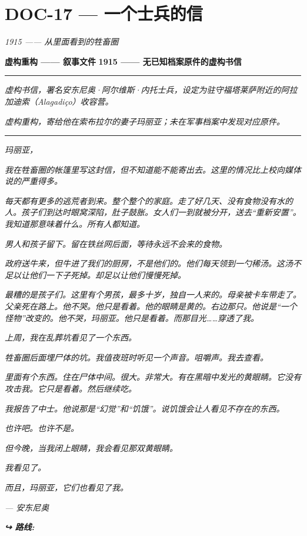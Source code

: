 \section*{\textbf{DOC-17} --- 一个士兵的信}

\noindent \textit{1915 —— 从里面看到的牲畜圈}

\noindent \textbf{虚构重构 —— 叙事文件}
\textbf{1915 —— 无已知档案原件的虚构书信}

\vspace{0.5em}\noindent\rule{\textwidth}{0.5pt}\vspace{0.5em}

\noindent \textit{虚构书信，署名安东尼奥·阿尔维斯·内托士兵，设定为驻守福塔莱萨附近的阿拉加迪索（Alagadiço）收容营。}

\noindent \textit{虚构重构，寄给他在索布拉尔的妻子玛丽亚；未在军事档案中发现对应原件。}

\vspace{0.5em}\noindent\rule{\textwidth}{0.5pt}\vspace{0.5em}

\noindent \textit{玛丽亚，}

\noindent \textit{我在牲畜圈的帐篷里写这封信，但不知道能不能寄出去。这里的情况比上校向媒体说的严重得多。}

\noindent \textit{每天都有更多的逃荒者到来。整个整个的家庭。走了好几天、没有食物没有水的人。孩子们到达时眼窝深陷，肚子鼓胀。女人们一到就被分开，送去“重新安置”。我知道那意味着什么。所有人都知道。}

\noindent \textit{男人和孩子留下。留在铁丝网后面，等待永远不会来的食物。}

\noindent \textit{政府送牛来，但牛进了我们的厨房，不是他们的。他们每天领到一勺稀汤。这汤不足以让他们一下子死掉。却足以让他们慢慢死掉。}

\noindent \textit{最糟的是孩子们。这里有个男孩，最多十岁，独自一人来的。母亲被卡车带走了。父亲死在路上。他不哭。他只是看着。他的眼睛是黄的。右边那只。他说是“一个怪物”改变的。他不哭，玛丽亚。他只是看着。而那目光……穿透了我。}

\noindent \textit{上周，我在乱葬坑看见了一个东西。}

\noindent \textit{牲畜圈后面埋尸体的坑。我值夜班时听见一个声音。咀嚼声。我去查看。}

\noindent \textit{里面有个东西。住在尸体中间。很大。非常大。有在黑暗中发光的黄眼睛。它没有攻击我。它只是看着。然后继续吃。}

\noindent \textit{我报告了中士。他说那是“幻觉”和“饥饿”。说饥饿会让人看见不存在的东西。}

\noindent \textit{也许吧。也许不是。}

\noindent \textit{但今晚，当我闭上眼睛，我会看见那双黄眼睛。}

\noindent \textit{我看见了。}

\noindent \textit{而且，玛丽亚，它们也看见了我。}

\noindent \textit{--- 安东尼奥}

\vspace{0.5em}
\noindent\textit{\textbf{↪ 路线:}  \rotasep {}}
